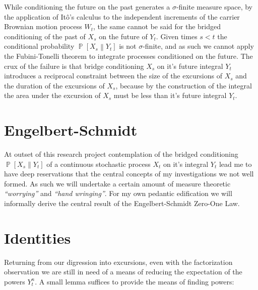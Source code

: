 \documentclass{article}
\theoremstyle{definition}\newtheorem{definition}{Definition}
\begin{document}
  While conditioning the future on the past generates a $\sigma$-finite measure space, by
  the application of It\^o's calculus to the independent increments of the carrier Brownian
  motion process $W_t$, the same cannot be said for the bridged conditioning of the past of
  $X_s$ on the future of $Y_t$. Given times $s<t$ the conditional probability
  $\operatorname{\mathbb{P}}\left[ X_s \right\rVert\left. Y_t \right]$ is not
  $\sigma$-finite, and as such we cannot apply the Fubini-Tonelli theorem to integrate
  processes conditioned on the future. The crux of the failure is that bridge conditioning
  $X_s$ on it's future integral $Y_t$ introduces a reciprocal constraint between the size
  of the excursions of $X_s$ and the duration of the excursions of $X_s$, because by the
  construction of the integral the area under the excursion of $X_s$ must be less than it's
  future integral $Y_t$.

  \section{Engelbert-Schmidt}
  At outset of this research project contemplation of the bridged conditioning
  $\operatorname{\mathbb{P}}\left[ X_s \right\rVert\left. Y_t \right]$ of a continuous
  stochastic process $X_t$ on it's integral $Y_t$ lead me to have deep reservations that
  the central concepts of my investigations we not well formed. As such we will undertake
  a certain amount of measure theoretic \emph{``worrying''} and \emph{``hand wringing''}.
  For my own pedantic edification we will informally derive the central result of the
  Engelbert-Schmidt Zero-One Law.

  \section{Identities}
  Returning from our digression into excursions, even with the factorization observation we
  are still in need of a means of reducing the expectation of the powers $Y_t^n$. A small
  lemma suffices to provide the means of finding powers:
\end{document}
